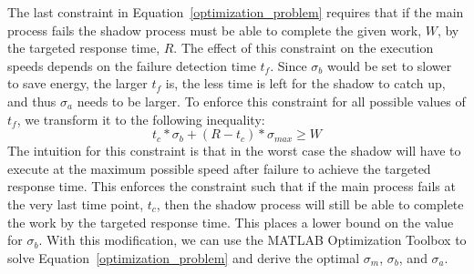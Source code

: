 The last constraint in Equation~\ref{optimization_problem} requires that
if the main process fails the shadow process must be able to complete
the given work, $W$, by the targeted response time, $R$. 
The effect of this constraint on the execution speeds depends on the failure 
detection time $t_f$. Since $\sigma_b$ would be set to slower to save energy,
the larger $t_f$ is, the less time is left for the shadow to catch up, and thus 
$\sigma_a$ needs to be larger.
To enforce this constraint for all possible values of $t_f$, we transform it to
the following inequality:
\begin{equation}
\label{work_constraint}
t_c*\sigma_b+(R-t_c)*\sigma_{max} \geq W 
\end{equation}
The intuition for this constraint is that in the worst case the shadow
will have to execute at the maximum possible speed after failure to
achieve the targeted response time. This enforces the constraint such
that if the main process fails at the very last time point, $t_c$,
then the shadow process will still be able to complete the work by the
targeted response time. This places a lower bound on the value for
$\sigma_b$. With this modification, we can use the MATLAB Optimization 
Toolbox to solve Equation~\ref{optimization_problem} and derive the optimal
$\sigma_m$, $\sigma_b$, and $\sigma_a$.

